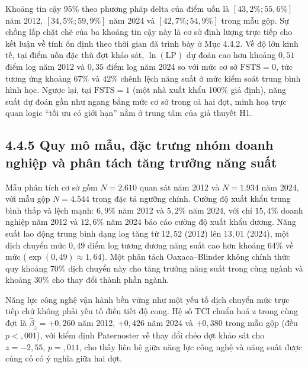 \documentclass[
  a4paper,
  13pt]{extreport}
\begin{document}
Khoảng tin cậy 95\% theo phương pháp delta của điểm uốn là
\([43{,}2\%; 55{,}6\%]\) năm 2012, \([34{,}5\%; 59{,}9\%]\) năm 2024 và
\([42{,}7\%; 54{,}9\%]\) trong mẫu gộp. Sự chồng lấp chặt chẽ của ba
khoảng tin cậy này là cơ sở định lượng trực tiếp cho kết luận về tính ổn
định theo thời gian đã trình bày ở Mục 4.4.2. Về độ lớn kinh tế, tại
điểm uốn đặc thù đợt khảo sát, \(\ln(\mathrm{LP})\) dự đoán cao hơn
khoảng \(0{,}51\) điểm log năm 2012 và \(0{,}35\) điểm log năm 2024 so
với mức cơ sở \(\mathrm{FSTS} = 0\), tức tương ứng khoảng \(67\%\) và
\(42\%\) chênh lệch năng suất ở mức kiểm soát trung bình hình học. Ngược
lại, tại \(\mathrm{FSTS} = 1\) (một nhà xuất khẩu 100\% giả định), năng
suất dự đoán gần như ngang bằng mức cơ sở trong cả hai đợt, minh hoạ
trực quan logic ``tối ưu có giới hạn'' nằm ở trung tâm của giả thuyết
H1.

\hypertarget{quy-muxf4-mux1eabu-ux111ux1eb7c-trux1b0ng-nhuxf3m-doanh-nghiux1ec7p-vuxe0-phuxe2n-tuxe1ch-tux103ng-trux1b0ux1edfng-nux103ng-suux1ea5t}{%
\subsection{4.4.5 Quy mô mẫu, đặc trưng nhóm doanh nghiệp và phân tách
tăng trưởng năng
suất}\label{quy-muxf4-mux1eabu-ux111ux1eb7c-trux1b0ng-nhuxf3m-doanh-nghiux1ec7p-vuxe0-phuxe2n-tuxe1ch-tux103ng-trux1b0ux1edfng-nux103ng-suux1ea5t}}

Mẫu phân tích cơ sở gồm \(N = 2.610\) quan sát năm 2012 và \(N = 1.934\)
năm 2024, với mẫu gộp \(N = 4.544\) trong đặc tả ngưỡng chính. Cường độ
xuất khẩu trung bình thấp và lệch mạnh: \(6{,}9\%\) năm 2012 và
\(5{,}2\%\) năm 2024, với chỉ \(15{,}4\%\) doanh nghiệp năm 2012 và
\(12{,}6\%\) năm 2024 báo cáo cường độ xuất khẩu dương. Năng suất lao
động trung bình dạng log tăng từ \(12{,}52\) (2012) lên \(13{,}01\)
(2024), một dịch chuyển mức \(0{,}49\) điểm log tương đương năng suất
cao hơn khoảng \(64\%\) về mức (\(\exp(0{,}49) \approx 1{,}64\)). Một
phân tách Oaxaca--Blinder không chính thức quy khoảng \(70\%\) dịch
chuyển này cho tăng trưởng năng suất trong cùng ngành và khoảng \(30\%\)
cho thay đổi thành phần ngành.

Năng lực công nghệ vận hành bền vững như một yếu tố dịch chuyển mức trực
tiếp chứ không phải yếu tố điều tiết độ cong. Hệ số TCI chuẩn hoá z
trong cùng đợt là \(\hat{\beta}_z = +0{,}260\) năm 2012, \(+0{,}426\)
năm 2024 và \(+0{,}380\) trong mẫu gộp (đều \(p < {,}001\)), với kiểm
định Paternoster về thay đổi chéo đợt khảo sát cho \(z = -2{,}55\),
\(p = {,}011\), cho thấy liên hệ giữa năng lực công nghệ và năng suất
được củng cố có ý nghĩa giữa hai đợt.
\end{document}
